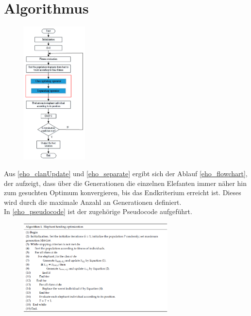 \section{Algorithmus}
\begin{figure}[ht]
    \begin{center}
        \includegraphics[width=0.3\textwidth]{assets/img/eho_flowchart.png}
        \caption[EHO Flowchart]{\cite[Li et al, S.4]{li_lei_alavi_wang_2020}}
        \label{eho_flowchart}
    \end{center}
\end{figure}
Aus \autoref{eho_clanUpdate} und \autoref{eho_separate} ergibt sich der Ablauf \autoref{eho_flowchart}, der aufzeigt, dass über die Generationen die einzelnen Elefanten immer näher hin zum gesuchten Optimum konvergieren, bis das Endkriterium erreicht ist. Dieses wird durch die maximale Anzahl an Generationen definiert.\\
In \autoref{eho_pseudocode} ist der zugehörige Pseudocode aufgeführt.\\
\begin{figure}[ht]
    \begin{center}
        \includegraphics[width=0.7\textwidth]{assets/img/eho_pseudocode.PNG}
        \caption[EHO Pseudocode]{\cite[Li et al, S.5]{li_lei_alavi_wang_2020}}
        \label{eho_pseudocode}
    \end{center}
\end{figure}
